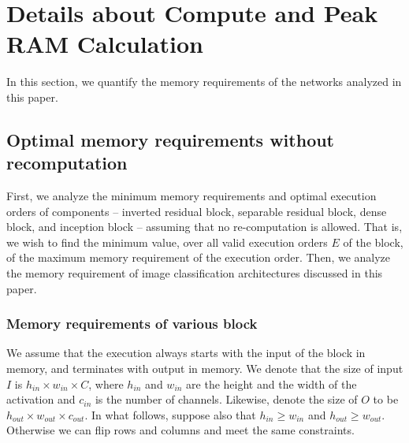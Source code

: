 \documentclass[10pt]{article}
\begin{document}
 \section{Details about Compute and Peak RAM Calculation}
\label{sec:peak}

In this section, we quantify the memory requirements of the networks
analyzed in this paper. 




\subsection{Optimal memory requirements  without recomputation}
\label{sec:opt-mem}
First, we analyze the minimum memory requirements and optimal
execution orders of components -- inverted residual block, separable
residual block, dense block, and inception block -- assuming that no
re-computation is allowed.  That is, we wish to find the minimum
value, over all valid execution orders $E$ of the block, of the
maximum memory requirement of the execution order.  Then, we analyze
the memory requirement of image classification architectures discussed
in this paper.

\subsubsection{Memory requirements of various block}
We assume that the
execution always starts with the input of the block in memory, and
terminates with output in memory. We denote that the size of input $I$
is $h_{in}\times w_{in} \times C$, where $h_{in}$ and $w_{in}$ are the
height and the width of the activation and $c_{in}$ is the number of
channels. Likewise, denote the size of $O$ to be $h_{out} \times
w_{out} \times c_{out}$. In what follows, suppose also that $h_{in}
\geq w_{in}$ and $h_{out} \geq w_{out}$. Otherwise we can flip rows
and columns and meet the same constraints.
\end{document}
